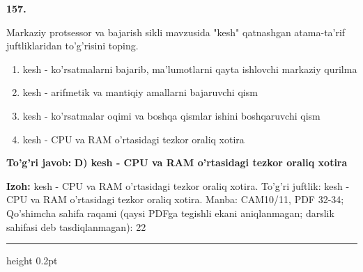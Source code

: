 \documentclass[10pt,a4paper]{article}
\begin{document}
{\bfseries\sffamily\color{ink} 157.}
\par
Markaziy protsessor va bajarish sikli mavzusida "kesh" qatnashgan atama-ta'rif juftliklaridan to'g'risini toping.
\begin{enumerate}[label=\Alph*),leftmargin=9mm]
\item kesh - ko'rsatmalarni bajarib, ma'lumotlarni qayta ishlovchi markaziy qurilma
\item kesh - arifmetik va mantiqiy amallarni bajaruvchi qism
\item kesh - ko'rsatmalar oqimi va boshqa qismlar ishini boshqaruvchi qism
\item kesh - CPU va RAM o'rtasidagi tezkor oraliq xotira
\end{enumerate}
\begin{tcolorbox}[enhanced,breakable,colback=teal!4,colframe=teal!60!black,boxrule=0.45pt,arc=1.2mm,left=2.7mm,right=2.7mm,top=1.8mm,bottom=1.8mm,before skip=2mm,after skip=2mm]
{\bfseries\sffamily\color{teal}To'g'ri javob:} \textbf{D) kesh - CPU va RAM o'rtasidagi tezkor oraliq xotira}
\par\smallskip
{\bfseries Izoh:} kesh - CPU va RAM o'rtasidagi tezkor oraliq xotira. To'g'ri juftlik: kesh - CPU va RAM o'rtasidagi tezkor oraliq xotira. Manba: CAM10/11, PDF 32-34; Qo'shimcha sahifa raqami (qaysi PDFga tegishli ekani aniqlanmagan; darslik sahifasi deb tasdiqlanmagan): 22
\end{tcolorbox}
\vspace{2mm}\hrule height 0.2pt\vspace{3mm}
\end{document}
